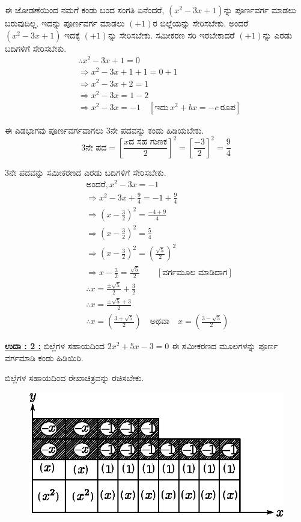 ಈ ಜೋಡಣೆಯಿಂದ ನಮಗೆ ಕಂಡು ಬಂದ ಸಂಗತಿ ಏನೆಂದರೆ, $(x^2 - 3x + 1)$ನ್ನು ಪೂರ್ಣವರ್ಗ ಮಾಡಲು ಬರುವುದಿಲ್ಲ. ಇದನ್ನು ಪೂರ್ಣವರ್ಗ ಮಾಡಲು $(+1)$ರ ಬಿಲ್ಲೆ\break ಯನ್ನು ಸೇರಿಸಬೇಕು. ಅಂದರೆ $(x^2 - 3x + 1)$ ಇದಕ್ಕೆ $(+1)$ನ್ನು ಸೇರಿಸಬೇಕು. ಸಮೀಕರಣ ಸರಿ ಇರಬೇಕಾದರೆ $(+1)$ನ್ನು ಎರಡು ಬದಿಗಳಿಗೆ ಸೇರಿಸಬೇಕು. 
\begin{align*}
& \therefore x^2 - 3x + 1 = 0\\
& \Rightarrow x^2 - 3x + 1 + 1 = 0 + 1\\
& \Rightarrow x^2 - 3x + 2 = 1\\
& \Rightarrow x^2 - 3x = 1 - 2\\
& \Rightarrow x^2 - 3x = -1 \quad [\text{ಇದು}~ x^2 + bx = -c ~\text{ರೂಪ}]
\end{align*}

ಈ ಎಡಭಾಗವು ಪೂರ್ಣವರ್ಗವಾಗಲು 3ನೇ ಪದವನ್ನು ಕಂಡು ಹಿಡಿಯಬೇಕು. 
$$
3\text{ನೇ ಪದ} = \left[\dfrac{x \text{ದ ಸಹ ಗುಣಕ}}{2} \right]^2 = \left[\dfrac{-3}{2}\right]^2 = \dfrac{9}{4}
$$

3ನೇ ಪದವನ್ನು ಸಮೀಕರಣದ ಎರಡು ಬದಿಗಳಿಗೆ ಸೇರಿಸಬೇಕು. 
\begin{align*}
& \text{ಅಂದರೆ}, x^2 - 3x = -1\\
& \Rightarrow x^2 - 3x + \frac{9}{4} = -1 + \frac{9}{4}\\
& \Rightarrow \left(x - \frac{3}{2} \right)^2 = \frac{-4 + 9}{4}\\
& \Rightarrow \left(x - \frac{3}{2} \right)^2 = \frac{5}{4}\\
& \Rightarrow \left(x - \frac{3}{2} \right)^2 = \left(\frac{\surd 5}{2}\right)^2\\
& \Rightarrow x - \frac{3}{2} = \frac{\surd 5}{2} \qquad [\text{ವರ್ಗಮೂಲ ಮಾಡಿದಾಗ}]\\
& \therefore x = \frac{\pm \surd 5}{2} + \frac{3}{2}\\
& \therefore x = \frac{\pm \surd 5 + 3}{2}\\
& \therefore x = \left(\frac{3 + \surd5}{2}\right) \quad\text{ಅಥವಾ}\quad x = \left(\frac{3 - \surd 5}{2}\right)
\end{align*}

\noindent
{\textbf{\underline{ಉದಾ : 2 :}}} ಬಿಲ್ಲೆಗಳ ಸಹಾಯದಿಂದ $2x^2 + 5x - 3 = 0$ ಈ ಸಮೀಕರಣದ ಮೂಲಗಳನ್ನು ಪೂರ್ಣ ವರ್ಗಮಾಡಿ ಕಂಡು ಹಿಡಿಯಿರಿ. 

ಬಿಲ್ಲೆಗಳ ಸಹಾಯದಿಂದ ರೇಖಾಚಿತ್ರವನ್ನು ರಚಿಸಬೇಕು.
\begin{figure}[H]
\centering
\includegraphics[scale=0.8]{src/figure/chap3/fig3-48.eps}
\end{figure}


